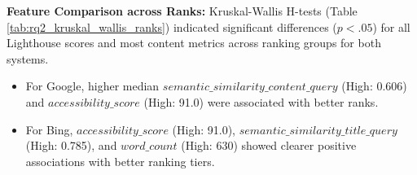 \documentclass[a4paper,fleqn]{cas-sc}
\begin{document}
\textbf{Feature Comparison across Ranks:} Kruskal-Wallis H-tests (Table \ref{tab:rq2_kruskal_wallis_ranks}) indicated significant differences ($p < .05$) for all Lighthouse scores and most content metrics across ranking groups for both systems.
\begin{itemize}
\item For Google, higher median $semantic\_similarity\_content\_query$ (High: 0.606) and $accessibility\_score$ (High: 91.0) were associated with better ranks.
\item For Bing, $accessibility\_score$ (High: 91.0), $semantic\_similarity\_title\_query$ (High: 0.785), and $word\_count$ (High: 630) showed clearer positive associations with better ranking tiers.
\end{itemize}

\end{document}
